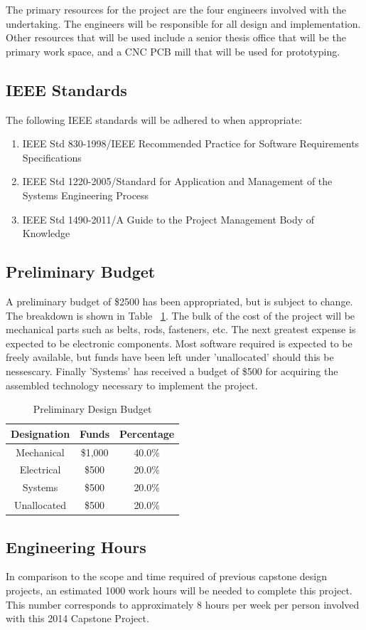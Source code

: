 \documentclass[11pt]{report}
\begin{document}
The primary resources for the project are the four engineers involved with the undertaking.
The engineers will be responsible for all design and implementation.
Other resources that will be used include a senior thesis office that will be the primary work space, and a CNC PCB mill that will be used for prototyping.

\subsection{IEEE Standards}
The following IEEE standards will be adhered to when appropriate:
\begin{enumerate} \parskip2pt
	\item IEEE Std 830-1998/IEEE Recommended Practice for Software Requirements Specifications
	\item IEEE Std 1220-2005/Standard for Application and Management of the Systems Engineering Process
	\item IEEE Std 1490-2011/A Guide to the Project Management Body of Knowledge
\end{enumerate}

\subsection{Preliminary Budget}
A preliminary budget of \$2500 has been appropriated, but is subject to change.
The breakdown is shown in Table ~\ref{table:budget}.
The bulk of the cost of the project will be mechanical parts such as belts, rods, fasteners, etc.
The next greatest expense is expected to be electronic components.
Most software required is expected to be freely available, but funds have been left under 'unallocated' should this be nessescary.
Finally 'Systems' has received a budget of \$500 for acquiring the assembled technology necessary to implement the project. 

\begin{table}[ht] 
	\centering 
	\begin{tabular}{c c c} 
		Designation	& Funds 		& Percentage\\
		\hline
		Mechanical	& \$1,000 	& 40.0\% \\ 
		Electrical	& \$500 		& 20.0\% \\ 
		Systems		& \$500 		& 20.0\% \\ 
		Unallocated	& \$500 		& 20.0\% \\
	\end{tabular} 
	\caption{Preliminary Design Budget}
	\label{table:budget}
\end{table}

\subsection{Engineering Hours}
In comparison to the scope and time required of previous capstone design projects, an estimated 1000 work hours will be needed to complete this project.
This number corresponds to approximately 8 hours per week per person involved with this 2014 Capstone Project.
\end{document}
